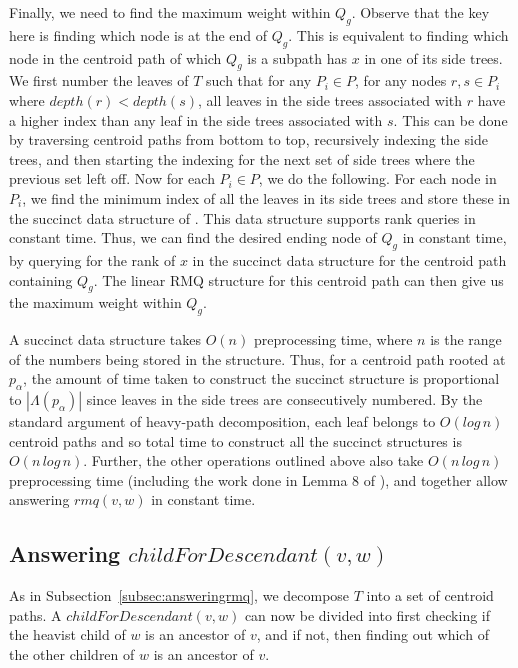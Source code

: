 \documentclass{article}
\newcommand{\leafset}{\Lambda}
\begin{document}
    Finally, we need to find the maximum weight within $Q_g$. Observe that the key here is finding which node is at the end of $Q_g$. This is equivalent to finding which node in the centroid path of which $Q_g$ is a subpath has $x$ in one of its side trees. We first number the leaves of $T$ such that for any $P_i \in P$, for any nodes $r, s \in P_i$ where $depth(r) < depth(s)$, all leaves in the side trees associated with $r$ have a higher index than any leaf in the side trees associated with $s$. This can be done by traversing centroid paths from bottom to top, recursively indexing the side trees, and then starting the indexing for the next set of side trees where the previous set left off. Now for each $P_i \in P$, we do the following. For each node in $P_i$, we find the minimum index of all the leaves in its side trees and store these in the succinct data structure of \cite{jacobson1988succinct}. This data structure supports rank queries in constant time. Thus, we can find the desired ending node of $Q_g$ in constant time, by querying for the rank of $x$ in the succinct data structure for the centroid path containing $Q_g$. The linear RMQ structure for this centroid path can then give us the maximum weight within $Q_g$.

    A succinct data structure takes $O(n)$ preprocessing time, where $n$ is the range of the numbers being stored in the structure. Thus, for a centroid path rooted at $p_{\alpha}$, the amount of time taken to construct the succinct structure is proportional to $|\leafset(p_{\alpha})|$ since leaves in the side trees are consecutively numbered. By the standard argument of heavy-path decomposition, each leaf belongs to $O(log\,n)$ centroid paths and so total time to construct all the succinct structures is $O(n\,log\,n)$. Further, the other operations outlined above also take $O(n\,log\,n)$ preprocessing time (including the work done in Lemma 8 of \cite{jansson2018algorithms}), and together allow answering $rmq(v, w)$ in constant time.

    \subsection{Answering $childForDescendant(v, w)$}
    \label{subsec:answeringcfd}

    As in Subsection~\ref{subsec:answeringrmq}, we decompose $T$ into a set of centroid paths. A $childForDescendant(v, w)$ can now be divided into first checking if the heavist child of $w$ is an ancestor of $v$, and if not, then finding out which of the other children of $w$ is an ancestor of $v$.
\end{document}

